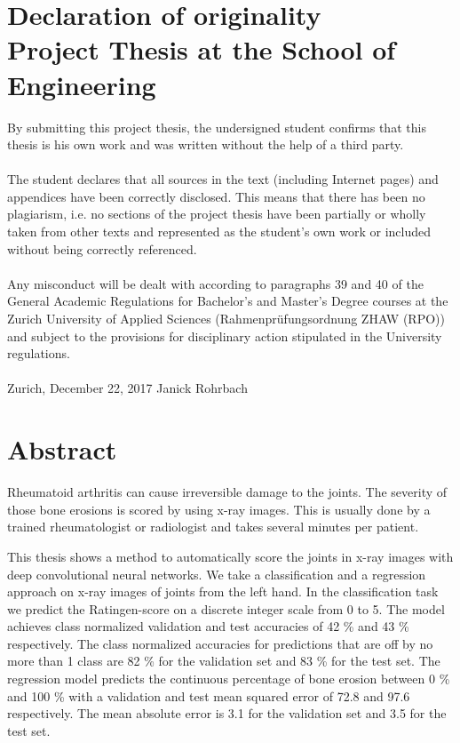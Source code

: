 \documentclass[12pt]{article}
\begin{document}
\section*{Declaration of originality\\ \large{Project Thesis at the School of Engineering}}
By submitting this project thesis, the undersigned student confirms that this thesis is his own work and was written without the help of a third party. \\
\\
The student declares that all sources in the text (including Internet pages) and appendices have been correctly disclosed. This means that there has been no plagiarism, i.e. no sections of the project thesis have been partially or wholly taken from other texts and represented as the student’s own work or included without being correctly referenced. \\
\\
Any misconduct will be dealt with according to paragraphs 39 and 40 of the General Academic Regulations for Bachelor’s and Master’s Degree courses at the Zurich University of Applied Sciences (Rahmenprüfungsordnung ZHAW (RPO)) and subject to the provisions for disciplinary action stipulated in the University regulations.\\
\vspace{3cm} \\
Zurich, December 22, 2017 \hspace{5cm} Janick Rohrbach

\newpage

\section*{Abstract}

Rheumatoid arthritis can cause irreversible damage to the joints. The severity of those bone erosions is scored by using x-ray images. This is usually done by a trained rheumatologist or radiologist and takes several minutes per patient.

This thesis shows a method to automatically score the joints in x-ray images with deep convolutional neural networks. We take a classification and a regression approach on x-ray images of joints from the left hand. In the classification task we predict the Ratingen-score on a discrete integer scale from 0 to 5. The model achieves class normalized validation and test accuracies of 42 \% and 43 \% respectively. The class normalized accuracies for predictions that are off by no more than 1 class are 82 \% for the validation set and 83 \% for the test set. The regression model predicts the continuous percentage of bone erosion between 0 \% and 100 \% with a validation and test mean squared error of 72.8 and 97.6 respectively. The mean absolute error is 3.1 for the validation set and 3.5 for the test set.
\end{document}
